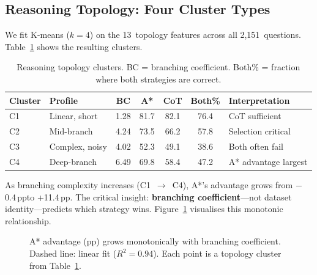 \documentclass[11pt]{article}
\newcommand{\pp}{\,pp}
\begin{document}
\subsection{Reasoning Topology: Four Cluster Types}
\label{sec:topology}

We fit K-means ($k{=}4$) on the 13~topology features across all 2,151~questions. Table~\ref{tab:topology} shows the resulting clusters.

\begin{table}[t]
\centering
\caption{Reasoning topology clusters. BC = branching coefficient. Both\% = fraction where both strategies are correct.}
\label{tab:topology}
\small
\begin{tabular}{@{}llccccp{3.5cm}@{}}
\toprule
\textbf{Cluster} & \textbf{Profile} & \textbf{BC} & \textbf{A*} & \textbf{CoT} & \textbf{Both\%} & \textbf{Interpretation} \\
\midrule
C1 & Linear, short & 1.28 & 81.7 & 82.1 & 76.4 & CoT sufficient \\
C2 & Mid-branch & 4.24 & 73.5 & 66.2 & 57.8 & Selection critical \\
C3 & Complex, noisy & 4.02 & 52.3 & 49.1 & 38.6 & Both often fail \\
C4 & Deep-branch & 6.49 & 69.8 & 58.4 & 47.2 & A* advantage largest \\
\bottomrule
\end{tabular}
\end{table}

As branching complexity increases (C1~$\rightarrow$~C4), A*'s advantage grows from $-$0.4\pp to +11.4\pp. The critical insight: \textbf{branching coefficient}---not dataset identity---predicts which strategy wins. Figure~\ref{fig:bc_advantage} visualises this monotonic relationship.

\begin{figure}[t]
\centering
{}
\caption{A* advantage (pp) grows monotonically with branching coefficient. Dashed line: linear fit ($R^2 = 0.94$). Each point is a topology cluster from Table~\ref{tab:topology}.}
\label{fig:bc_advantage}
\end{figure}
\end{document}
